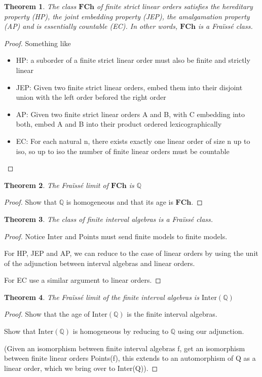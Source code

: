 \documentclass[11pt %
              ]{article}
\newcommand{\inter}[1]{\text{Inter}\left(#1\right)}
\theoremstyle{plain}
\newtheorem{thm}{Theorem}%
\theoremstyle{definition}
\theoremstyle{remark}
\begin{document}

\begin{thm}
  The class $\mathbf{FCh}$ of finite strict linear orders satisfies the hereditary property (HP),
  the joint embedding property (JEP), the amalgamation property (AP) and is essentially countable
  (EC). In other words, $\textbf{FCh}$ is a Fraïssé class.
\end{thm}
\begin{proof}
  Something like
  \begin{itemize}
    \item HP: a suborder of a finite strict linear order must also be finite and strictly linear
    \item JEP: Given two finite strict linear orders, embed them into their disjoint union with
      the left order befored the right order
    \item AP: Given two finite strict linear orders A and B, with C embedding into both,
      embed A and B into their product ordered lexicographically
    \item EC: For each natural n, there exists exactly one linear order of size n up to iso, so
      up to iso the number of finite linear orders must be countable
  \end{itemize}
\end{proof}

\begin{thm}
  The Fraïssé limit of $\textbf{FCh}$ is $\mathbb{Q}$
\end{thm}
\begin{proof}
  Show that $\mathbb{Q}$ is homogeneous and that its age is $\textbf{FCh}$.
\end{proof}

\begin{thm}
  The class of finite interval algebras is a Fraïssé class.
\end{thm}
\begin{proof}
  Notice $\text{Inter}$ and $\text{Points}$ must send finite models to finite models.

  For HP, JEP and AP, we can reduce to the case of linear orders by using the unit of the
  adjunction between interval algebras and linear orders.

  For EC use a similar argument to linear orders.
\end{proof}

\begin{thm}
  The Fraïssé limit of the finite interval algebras is $\inter{\mathbb{Q}}$
\end{thm}
\begin{proof}
  Show that the age of $\inter{\mathbb{Q}}$ is the finite interval algebras.

  Show that $\inter{\mathbb{Q}}$ is homogeneous by reducing to $\mathbb{Q}$ using our adjunction.

  (Given an isomorphism between finite interval algebras f, get an isomorphism between finite linear
  orders Points(f), this extends to an automorphism of Q as a linear order, which we bring over
  to Inter(Q)).
\end{proof}
\end{document}
